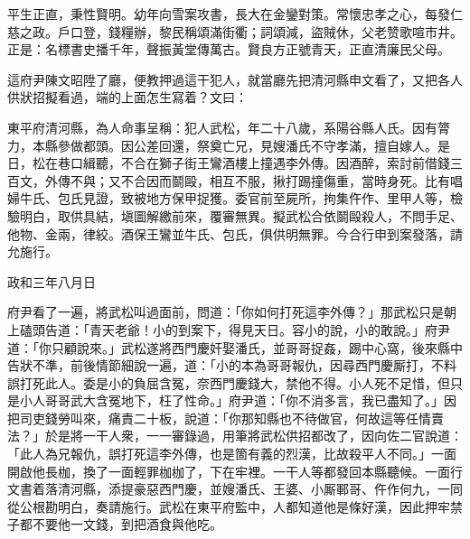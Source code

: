 \begin{myquote}
平生正直，秉性賢明。幼年向雪案攻書，長大在金鑾對策。常懷忠孝之心，每發仁慈之政。戶口登，錢糧辦，黎民稱頌滿街衢；詞頌減，盜賊休，父老赞歌喧市井。正是：名標書史播千年，聲振黃堂傳萬古。賢良方正號青天，正直清廉民父母。
\end{myquote}

這府尹陳文昭陞了廳，便教押過這干犯人，就當廳先把清河縣申文看了，又把各人供狀招擬看過，端的上面怎生寫着？文曰：

\begin{myquote}[\markfont]
東平府清河縣，為人命事呈稱：犯人武松，年二十八歲，系陽谷縣人氏。因有膂力，本縣參做都頭。因公差回還，祭奠亡兄，見嫂潘氏不守孝滿，擅自嫁人。是日，松在巷口緝聽，不合在獅子街王鸞酒樓上撞遇李外傳。因酒醉，索討前借錢三百文，{}外傳不與；又不合因而鬬毆，相互不服，揪打踢撞傷重，當時身死。比有唱婦牛氏、包氏見證，致被地方保甲捉獲。委官前至屍所，拘集仵作、里甲人等，檢驗明白，取供具結，塡圖解繳前來，覆審無異。擬武松合依鬬毆殺人，不問手足、他物、金兩，律絞。酒保王鸞並牛氏、包氏，俱供明無罪。今合行申到案發落，請允施行。

政和三年八月日


\end{myquote}

府尹看了一遍，將武松叫過面前，問道：「你如何打死這李外傳？」那武松只是朝上磕頭告道：「青天老爺！小的到案下，得見天日。容小的說，小的敢說。」府尹道：「你只顧說來。」武松遂將西門慶奸娶潘氏，並哥哥捉姦，踢中心窩，後來縣中告狀不準，前後情節細說一遍，道：「小的本為哥哥報仇，因尋西門慶厮打，不料誤打死此人。委是小的負屈含冤，奈西門慶錢大，禁他不得。小人死不足惜，但只是小人哥哥武大含冤地下，枉了性命。」府尹道：「你不消多言，我已盡知了。」因把司吏錢勞叫來，痛責二十板，說道：「你那知縣也不待做官，何故這等任情賣法？」於是將一干人衆，一一審錄過，用筆將武松供招都改了，因向佐二官說道：「此人為兄報仇，誤打死這李外傳，也是箇有義的烈漢，比故殺平人不同。」一面開啟他長枷，換了一面輕罪枷枷了，下在牢裡。一干人等都發回本縣聽候。一面行文書着落清河縣，添提豪惡西門慶，並嫂潘氏、王婆、小厮鄆哥、仵作何九，一同從公根勘明白，奏請施行。武松在東平府監中，人都知道他是條好漢，因此押牢禁子都不要他一文錢，到把酒食與他吃。

